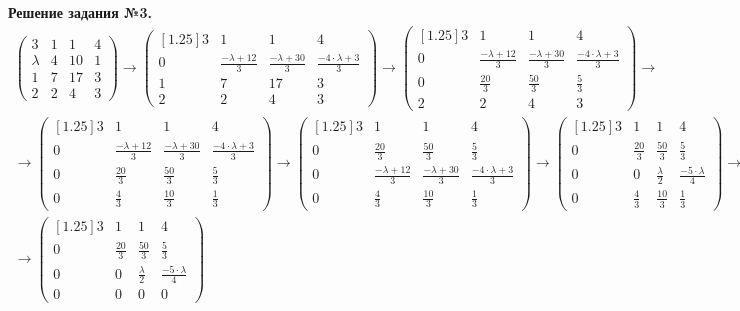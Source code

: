 \documentclass[a4paper, 12pt]{article}
\begin{document}
\vspace{0.5cm}

\textbf{Решение задания №3.}
\begin{gather*}
    \begin{pmatrix}
        3 & 1 & 1 & 4 \\ 
        \lambda & 4 & 10 & 1 \\ 
        1 & 7 & 17 & 3 \\
        2 & 2 & 4 & 3 
    \end{pmatrix} \rightarrow
    \begin{pmatrix}[1.25]
        3 & 1 & 1 & 4 \\
        0 & \frac{-\lambda+12}{3} & \frac{-\lambda+30}{3} & \frac{-4\cdot\lambda+3}{3} \\
        1 & 7 & 17 & 3 \\
        2 & 2 & 4 & 3
    \end{pmatrix} \rightarrow
    \begin{pmatrix}[1.25]
        3 & 1 & 1 & 4 \\
        0 & \frac{-\lambda+12}{3} & \frac{-\lambda+30}{3} & \frac{-4\cdot\lambda+3}{3} \\
        0 & \frac{20}{3} & \frac{50}{3} & \frac{5}{3} \\
        2 & 2 & 4 & 3
    \end{pmatrix} \rightarrow \\ \rightarrow
    \begin{pmatrix}[1.25]
       3 & 1 & 1 & 4 \\
       0 & \frac{-\lambda+12}{3} & \frac{-\lambda+30}{3} & \frac{-4\cdot\lambda+3}{3} \\
       0 & \frac{20}{3} & \frac{50}{3} & \frac{5}{3} \\
       0 & \frac{4}{3} & \frac{10}{3} & \frac{1}{3}
    \end{pmatrix} \rightarrow
    \begin{pmatrix}[1.25]
        3 & 1 & 1 & 4 \\
        0 & \frac{20}{3} & \frac{50}{3} & \frac{5}{3} \\
        0 & \frac{-\lambda+12}{3} & \frac{-\lambda+30}{3} & \frac{-4\cdot\lambda+3}{3} \\
        0 & \frac{4}{3} & \frac{10}{3} & \frac{1}{3}
    \end{pmatrix} \rightarrow
    \begin{pmatrix}[1.25]
        3 & 1 & 1 & 4 \\
        0 & \frac{20}{3} & \frac{50}{3} & \frac{5}{3} \\
        0 & 0 & \frac{\lambda}{2} & \frac{-5\cdot\lambda}{4} \\
        0 & \frac{4}{3} & \frac{10}{3} & \frac{1}{3}
    \end{pmatrix} \rightarrow \\ \rightarrow 
    \begin{pmatrix}[1.25]
        3 & 1 & 1 & 4 \\
        0 & \frac{20}{3} & \frac{50}{3} & \frac{5}{3} \\
        0 & 0 & \frac{\lambda}{2} & \frac{-5\cdot\lambda}{4} \\
        0 & 0 & 0 & 0
    \end{pmatrix}
\end{gather*}
\end{document}
